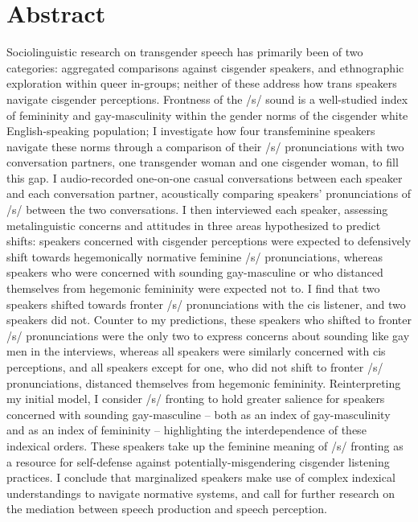 \documentclass[12pt,twoside]{reedthesis}
\begin{document}
    \chapter*{Abstract}
Sociolinguistic research on transgender speech has primarily been of two categories: aggregated comparisons against cisgender speakers, and ethnographic exploration within queer in-groups; neither of these address how trans speakers navigate cisgender perceptions. Frontness of the /s/ sound is a well-studied index of femininity and gay-masculinity within the gender norms of the cisgender white English-speaking population; I investigate how four transfeminine speakers navigate these norms through a comparison of their /s/ pronunciations with two conversation partners, one transgender woman and one cisgender woman, to fill this gap. I audio-recorded one-on-one casual conversations between each speaker and each conversation partner, acoustically comparing speakers' pronunciations of /s/ between the two conversations. I then interviewed each speaker, assessing metalinguistic concerns and attitudes in three areas hypothesized to predict shifts: speakers concerned with cisgender perceptions were expected to defensively shift towards hegemonically normative feminine /s/ pronunciations, whereas speakers who were concerned with sounding gay-masculine or who distanced themselves from hegemonic femininity were expected not to. I find that two speakers shifted towards fronter /s/ pronunciations with the cis listener, and two speakers did not. Counter to my predictions, these speakers who shifted to fronter /s/ pronunciations were the only two to express concerns about sounding like gay men in the interviews, whereas all speakers were similarly concerned with cis perceptions, and all speakers except for one, who did not shift to fronter /s/ pronunciations, distanced themselves from hegemonic femininity. Reinterpreting my initial model, I consider /s/ fronting to hold greater salience for speakers concerned with sounding gay-masculine -- both as an index of gay-masculinity and as an index of femininity -- highlighting the interdependence of these indexical orders. These speakers take up the feminine meaning of /s/ fronting as a resource for self-defense against potentially-misgendering cisgender listening practices. I conclude that marginalized speakers make use of complex indexical understandings to navigate normative systems, and call for further research on the mediation between speech production and speech perception.
	
\end{document}
